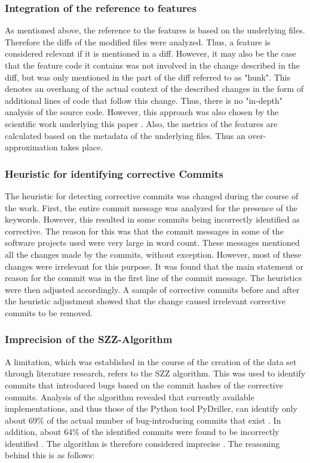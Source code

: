 \subsubsection*{Integration of the reference to features}
As mentioned above, the reference to the features is based on the underlying files. Therefore the diffs of the modified files were analyzed. Thus, a feature is considered relevant if it is mentioned in a diff. However, it may also be the case that the feature code it contains was not involved in the change described in the diff, but was only mentioned in the part of the diff referred to as "hunk". This denotes an overhang of the actual context of the described changes in the form of additional lines of code that follow this change. Thus, there is no "in-depth" analysis of the source code. However, this approach was also chosen by the scientific work underlying this paper \cite{Queiroz2016}. Also, the metrics of the features are calculated based on the metadata of the underlying files. Thus an over-approximation takes place.

\subsubsection*{Heuristic for identifying corrective Commits}
The heuristic for detecting corrective commits was changed during the course of the work. First, the entire commit message was analyzed for the presence of the keywords. However, this resulted in some commits being incorrectly identified as corrective. The reason for this was that the commit messages in some of the software projects used were very large in word count. These messages mentioned all the changes made by the commits, without exception. However, most of these changes were irrelevant for this purpose. It was found that the main statement or reason for the commit was in the first line of the commit message. The heuristics were then adjusted accordingly. A sample of corrective commits before and after the heuristic adjustment showed that the change caused irrelevant corrective commits to be removed.

\subsubsection*{Imprecision of the SZZ-Algorithm}

A limitation, which was established in the course of the creation of the data set through literature research, refers to the SZZ algorithm. This was used to identify commits that introduced bugs based on the commit hashes of the corrective commits. Analysis of the algorithm revealed that currently available implementations, and thus those of the Python tool PyDriller, can identify only about 69\% of the actual number of bug-introducing commits that exist \cite{Wen2019}. In addition, about 64\% of the identified commits were found to be incorrectly identified \cite{Wen2019}. The algorithm is therefore considered imprecise \cite{Wen2019}. The reasoning behind this is as follows:

